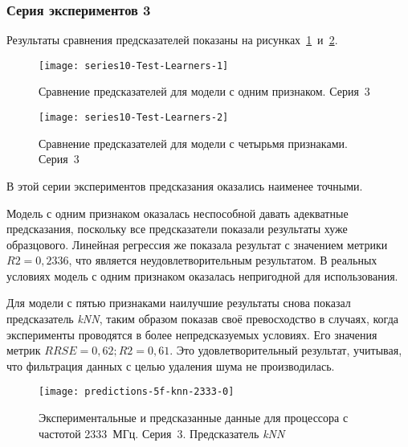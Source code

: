 \subsubsection{Серия экспериментов 3}

Результаты сравнения предсказателей показаны на рисунках~\ref{img:series10-Test-Learners-1}~и~\ref{img:series10-Test-Learners-2}.

\begin{figure}
    \begin{center}
        \texttt{[image: series10-Test-Learners-1]}
        \caption{Сравнение предсказателей для модели с одним признаком. Серия~3} %
        \label{img:series10-Test-Learners-1} %
    \end{center}
\end{figure}

\begin{figure}
    \begin{center}
        \texttt{[image: series10-Test-Learners-2]}
        \caption{Сравнение предсказателей для модели с четырьмя признаками. Серия~3}
        \label{img:series10-Test-Learners-2}
    \end{center}
\end{figure}

В этой серии экспериментов предсказания оказались наименее точными.

Модель с одним признаком оказалась неспособной давать адекватные предсказания, поскольку все предсказатели показали результаты хуже образцового. Линейная регрессия же показала результат с значением метрики $R2 = 0,2336$, что является неудовлетворительным результатом. В реальных условиях модель с одним признаком оказалась непригодной для использования.

Для модели с пятью признаками наилучшие результаты снова показал предсказатель \textit{kNN}, таким образом показав своё превосходство в случаях, когда эксперименты проводятся в более непредсказуемых условиях. Его значения метрик $RRSE = 0,62; R2 = 0,61$. Это удовлетворительный результат, учитывая, что фильтрация данных с целью удаления шума не производилась.

\begin{figure}
    \begin{center}
        \texttt{[image: predictions-5f-knn-2333-0]}
        \caption{Экспериментальные и предсказанные данные для процессора с частотой 2333~МГц. Серия~3. Предсказатель \textit{kNN}}
        \label{img:predictions-5f-knn-2333-0}
    \end{center}
\end{figure}

